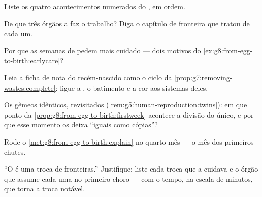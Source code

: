 \begin{exercise}[$\star$]\label{exo:g8:from-egg-to-birth:6}
Liste os quatro acontecimentos numerados do , em ordem.
\end{exercise}

\begin{exercise}[$\star\star$]\label{exo:g8:from-egg-to-birth:7}
De que três órgãos a  faz o trabalho? Diga o capítulo de
fronteira que tratou de cada um.
\end{exercise}

\begin{exercise}[$\star\star$]\label{exo:g8:from-egg-to-birth:8}
Por que as semanas de  pedem mais cuidado --- dois motivos do
\cref{ex:g8:from-egg-to-birth:earlycare}?
\end{exercise}

\begin{exercise}[$\star\star$]\label{exo:g8:from-egg-to-birth:9}
Leia a ficha de nota do recém-nascido como o ciclo da
\cref{prop:g7:removing-wastes:complete}: ligue a , o
batimento e a cor aos sistemas deles.
\end{exercise}

\begin{exercise}[$\star\star$]\label{exo:g8:from-egg-to-birth:10}
Os gêmeos idênticos, revisitados
(\cref{rem:g5:human-reproduction:twins}): em que ponto da
\cref{prop:g8:from-egg-to-birth:firstweek} acontece a divisão do
 único, e por que esse momento os deixa ``iguais como cópias''?
\end{exercise}

\begin{exercise}[$\star\star$]\label{exo:g8:from-egg-to-birth:11}
Rode o \cref{met:g8:from-egg-to-birth:explain} no quarto mês --- o mês
dos primeiros chutes.
\end{exercise}

\begin{exercise}[$\star\star\star$]\label{exo:g8:from-egg-to-birth:12}
``O  é uma troca de fronteiras.'' Justifique: liste cada
troca que a  cuidava e o órgão que assume cada uma no primeiro
choro --- com o tempo, na escala de minutos, que torna a troca notável.
\end{exercise}

